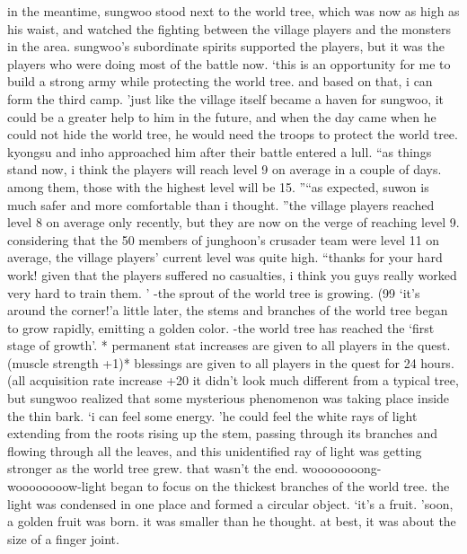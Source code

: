 in the meantime, sungwoo stood next to the world tree, which was now as high as his waist, and watched the fighting between the village players and the monsters in the area.
 sungwoo’s subordinate spirits supported the players, but it was the players who were doing most of the battle now.
‘this is an opportunity for me to build a strong army while protecting the world tree.
 and based on that, i can form the third camp.
’just like the village itself became a haven for sungwoo, it could be a greater help to him in the future, and when the day came when he could not hide the world tree, he would need the troops to protect the world tree.
kyongsu and inho approached him after their battle entered a lull.
“as things stand now, i think the players will reach level 9 on average in a couple of days.
 among them, those with the highest level will be 15.
”“as expected, suwon is much safer and more comfortable than i thought.
”the village players reached level 8 on average only recently, but they are now on the verge of reaching level 9.
considering that the 50 members of junghoon’s crusader team were level 11 on average, the village players’ current level was quite high.
“thanks for your hard work! given that the players suffered no casualties, i think you guys really worked very hard to train them.
’
-the sprout of the world tree is growing.
 (99%
‘it’s around the corner!’a little later, the stems and branches of the world tree began to grow rapidly, emitting a golden color.
-the world tree has reached the ‘first stage of growth’.
* permanent stat increases are given to all players in the quest.
 (muscle strength +1)* blessings are given to all players in the quest for 24 hours.
 (all acquisition rate increase +20%
it didn’t look much different from a typical tree, but sungwoo realized that some mysterious phenomenon was taking place inside the thin bark.
‘i can feel some energy.
’he could feel the white rays of light extending from the roots rising up the stem, passing through its branches and flowing through all the leaves, and this unidentified ray of light was getting stronger as the world tree grew.
that wasn’t the end.
woooooooong- woooooooow-light began to focus on the thickest branches of the world tree.
 the light was condensed in one place and formed a circular object.
‘it’s a fruit.
’soon, a golden fruit was born.
 it was smaller than he thought.
 at best, it was about the size of a finger joint.
